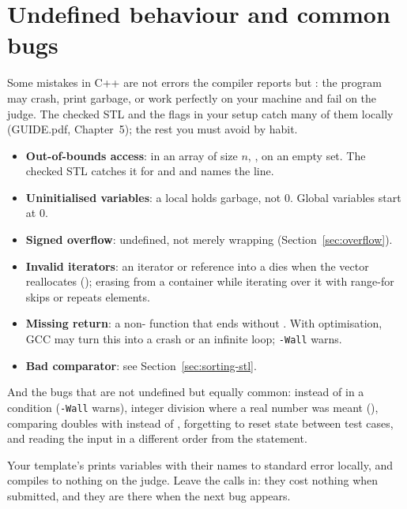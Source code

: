 \section[Undefined behaviour and common bugs]{Undefined behaviour and common bugs \hfill \bronze}\label{sec:ub}

Some mistakes in C++ are not errors the compiler reports but : the program may crash, print
garbage, or work perfectly on your machine and fail on the judge. The checked STL and the flags in your setup catch many of
them locally (GUIDE.pdf, Chapter~5); the rest you must avoid by habit.

\begin{itemize}
  \item \textbf{Out-of-bounds access}:  in an array of size $n$, ,  on an empty set. The
        checked STL catches it for  and  and names the line.
  \item \textbf{Uninitialised variables}: a local  holds garbage, not 0. Global variables start at 0.
  \item \textbf{Signed overflow}: undefined, not merely wrapping (Section~\ref{sec:overflow}).
  \item \textbf{Invalid iterators}: an iterator or reference into a  dies when the vector reallocates
        (); erasing from a container while iterating over it with range-for skips or repeats elements.
  \item \textbf{Missing return}: a non- function that ends without . With optimisation, GCC may turn
        this into a crash or an infinite loop; \texttt{-Wall} warns.
  \item \textbf{Bad comparator}: see Section~\ref{sec:sorting-stl}.
\end{itemize}

And the bugs that are not undefined but equally common: \cc{=} instead of \cc{==} in a condition (\texttt{-Wall} warns),
integer division where a real number was meant (), comparing doubles with \cc{==} instead of
, forgetting to reset state between test cases, and reading the input in a different order from the
statement.

\begin{tip}
Your template's  prints variables with their names to standard error locally, and compiles to nothing on
the judge. Leave the calls in: they cost nothing when submitted, and they are there when the next bug appears.
\end{tip}

